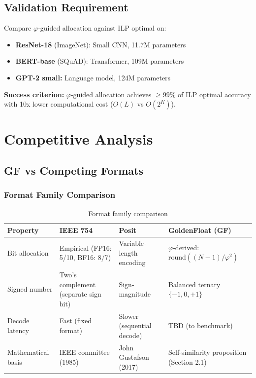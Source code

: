 \documentclass{article}
\begin{document}
\subsection{Validation Requirement}

Compare $\varphi$-guided allocation against ILP optimal on:

\begin{itemize}
    \item \textbf{ResNet-18} (ImageNet): Small CNN, 11.7M parameters
    \item \textbf{BERT-base} (SQuAD): Transformer, 109M parameters
    \item \textbf{GPT-2 small:} Language model, 124M parameters
\end{itemize}

\textbf{Success criterion:} $\varphi$-guided allocation achieves $\geq 99\%$ of ILP optimal accuracy with 10x lower computational cost ($O(L)$ vs $O(2^K)$).


\section{Competitive Analysis}

\subsection{GF vs Competing Formats}

\subsubsection{Format Family Comparison}

\begin{table}[h]
\centering
\begin{tabular}{llll}
\toprule
Property & IEEE 754 & Posit & GoldenFloat (GF) \\
\midrule
Bit allocation & Empirical (FP16: 5/10, BF16: 8/7) & Variable-length encoding & $\varphi$-derived: $\text{round}((N-1)/\varphi^2)$ \\
Signed number & Two's complement (separate sign bit) & Sign-magnitude & Balanced ternary $\{-1, 0, +1\}$ \\
Decode latency & Fast (fixed format) & Slower (sequential decode) & TBD (to benchmark) \\
Mathematical basis & IEEE committee (1985) & John Gustafson (2017) & Self-similarity proposition (Section 2.1) \\
\bottomrule
\end{tabular}
\caption{Format family comparison}
\end{table}
\end{document}
